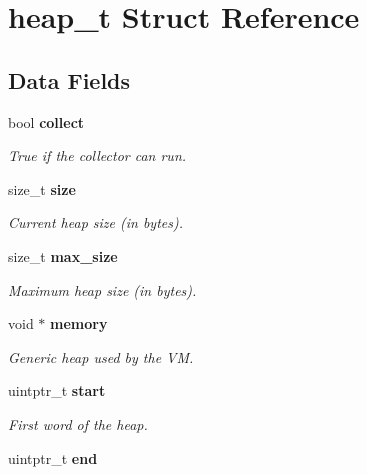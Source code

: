 \section{heap\_\-t Struct Reference}
\label{structheap__t}
\subsection*{Data Fields}
\begin{DoxyCompactItemize}
\item 
bool {\bf collect}\label{structheap__t_afe4a182f63e71bb09a6082f32c005c4f}

\begin{DoxyCompactList}\small\item\em True if the collector can run. \item\end{DoxyCompactList}\item 
size\_\-t {\bf size}\label{structheap__t_a054b24d6fc17dcd8c2f6d934cc24935f}

\begin{DoxyCompactList}\small\item\em Current heap size (in bytes). \item\end{DoxyCompactList}\item 
size\_\-t {\bf max\_\-size}\label{structheap__t_a92a5aefc2f2355a7300f337b76e6050e}

\begin{DoxyCompactList}\small\item\em Maximum heap size (in bytes). \item\end{DoxyCompactList}\item 
void $\ast$ {\bf memory}\label{structheap__t_a20022ca4f2cfd567d4e65aed47200a57}

\begin{DoxyCompactList}\small\item\em Generic heap used by the VM. \item\end{DoxyCompactList}\item 
uintptr\_\-t {\bf start}\label{structheap__t_a91b9ca7d7bfae159e6e71153247f73ab}

\begin{DoxyCompactList}\small\item\em First word of the heap. \item\end{DoxyCompactList}\item 
uintptr\_\-t {\bf end}\label{structheap__t_a9811cf54966509b6e90dfa0e6aa33b6f}


\end{DoxyCompactItemize}
